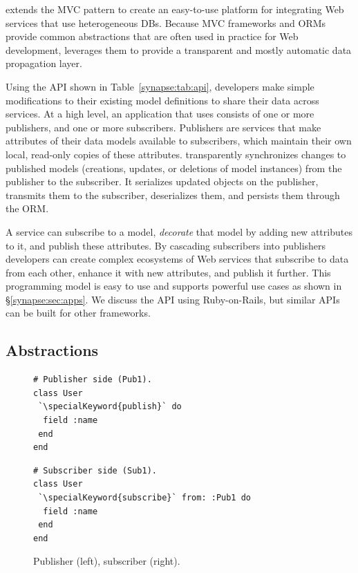 \synapse extends the MVC pattern to create an
easy-to-use platform for integrating Web services that use
heterogeneous DBs.  
Because MVC frameworks and ORMs provide common abstractions that are
often used in practice for Web development, \synapse
leverages them to provide a transparent and mostly automatic data
propagation layer.

Using the \synapse API shown in Table~\ref{synapse:tab:api}, developers make
simple modifications to their existing model definitions to share their data
across services. At a high
level, an application that uses \synapse consists of one or more publishers,
and one or more subscribers. Publishers are services that make attributes of
their data models available to subscribers, which maintain their own local,
read-only copies of these attributes. \synapse transparently
synchronizes changes to published models (creations, updates, or deletions of
model instances) from the publisher to the subscriber.  It serializes
updated objects on the publisher, transmits them to the subscriber, deserializes
them, and persists them through the ORM.

A service can
subscribe to a model, \emph{decorate} that model by adding new
attributes to it, and publish these attributes. By cascading
subscribers into publishers developers can create complex
ecosystems of Web services that subscribe to data from each other, enhance it
with new attributes, and publish it further.  This
programming model is easy to use and supports powerful use
cases as shown in \S\ref{synapse:sec:apps}.
We discuss the \synapse API using Ruby-on-Rails, but similar APIs can be
built for other frameworks.


\subsection{\synapse Abstractions}
\label{synapse:sec:api}

\begin{figure}
\centering
\begin{minipage}{.8\textwidth}
\begin{minipage}{.4\textwidth}
\begin{lstlisting}[framexleftmargin=5pt]
# Publisher side (Pub1).
class User
 `\specialKeyword{publish}` do
  field :name
 end
end
\end{lstlisting}
\end{minipage}
\hspace{1.2in}
\begin{minipage}{.4\textwidth}
\begin{lstlisting}[framexleftmargin=5pt]
# Subscriber side (Sub1).
class User
 `\specialKeyword{subscribe}` from: :Pub1 do
  field :name
 end
end
\end{lstlisting}
\end{minipage}
\end{minipage}
\caption{{Publisher (left), subscriber (right).}}
\label{synapse:fig:pub-sub}
\end{figure}

